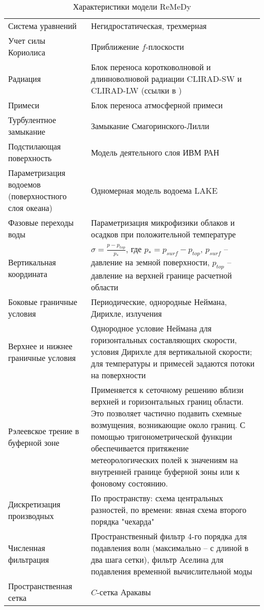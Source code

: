 \documentclass[12pt,a4paper]{report}
\begin{document}
\renewcommand{\arraystretch}{2}
\begin{table}
\centering
\caption{Характеристики модели ReMeDy}
\label{tab:model}
\small
\begin{tabu} to 
\toprule
Система уравнений & Негидростатическая, трехмерная \\
Учет силы Кориолиса & Приближение $f$-плоскости \\
Радиация & Блок переноса коротковолновой и длинноволновой радиации CLIRAD-SW и CLIRAD-LW (ссылки в \citep{StepanenkoMikushin2008})\\
Примеси & Блок переноса атмосферной примеси \citep{StepanenkoMikushin2008} \\
Турбулентное замыкание	& Замыкание Смагоринского-Лилли \citep{Smagorinsky1958,Lilly1962}\\
Подстилающая поверхность & Модель деятельного слоя ИВМ РАН \citep{VolodinLykosov1998} \\
Параметризация водоемов (поверхностного слоя океана)	& Одномерная модель водоема LAKE \citep{StepanenkoEtAl2011} \\
Фазовые переходы воды & Параметризация микрофизики облаков и осадков при положительной температуре \citep{TeixeiraMiranda1997}\\
Вертикальная координата & $\sigma=\frac{p-p_{top}}{p_*}$, где $p_*=p_{surf}-p_{top}$, $p_{surf}$ -- давление на земной поверхности, $p_{top}$ -- давление на верхней границе расчетной области \\
Боковые граничные условия & Периодические, однородные Неймана, Дирихле, излучения \\
Верхнее и нижнее граничные условия & Однородное условие Неймана для горизонтальных составляющих скорости, условия Дирихле для вертикальной скорости; для температуры и примесей задаются потоки на поверхности \\
Рэлеевское трение в буферной зоне & Применяется к сеточному решению вблизи верхней и горизонтальных границ области. Это позволяет частично подавить схемные возмущения, возникающие около границ. С помощью тригонометрической функции обеспечивается притяжение метеорологических полей к значениям на внутренней границе буферной зоны или к фоновому состоянию. \\
Дискретизация производных & По пространству: схема центральных разностей, по времени: явная схема второго порядка "чехарда" \\
Численная фильтрация & Пространственный фильтр 4-го порядка для подавления волн (максимально – с длиной в два шага сетки), фильтр Аселина для подавления временной вычислительной моды \\
Пространственная сетка & $C$-сетка Аракавы \\
\bottomrule
\end{tabu}
\end{table}
\end{document}
